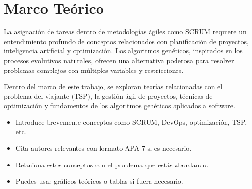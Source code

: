 \section{Marco Teórico}

La asignación de tareas dentro de metodologías ágiles como SCRUM requiere un entendimiento profundo de conceptos relacionados con planificación de proyectos, inteligencia artificial y optimización. Los algoritmos genéticos, inspirados en los procesos evolutivos naturales, ofrecen una alternativa poderosa para resolver problemas complejos con múltiples variables y restricciones.

Dentro del marco de este trabajo, se exploran teorías relacionadas con el problema del viajante (TSP), la gestión ágil de proyectos, técnicas de optimización y fundamentos de los algoritmos genéticos aplicados a software.

\vspace{0.5cm}

\begin{tcolorbox}[colback=gray!10, colframe=black!30, title={Sugerencias para esta sección}]
    \begin{itemize}
        \item Introduce brevemente conceptos como SCRUM, DevOps, optimización, TSP, etc.
        \item Cita autores relevantes con formato APA 7 si es necesario.
        \item Relaciona estos conceptos con el problema que estás abordando.
        \item Puedes usar gráficos teóricos o tablas si fuera necesario.
    \end{itemize}
\end{tcolorbox}
